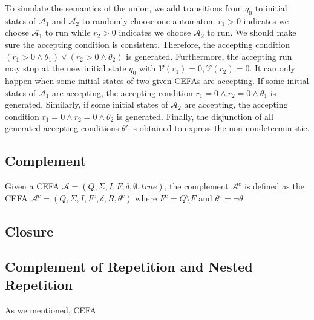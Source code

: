 \documentclass[runningheads]{llncs}
\newcommand*{\aut}{\mathcal{A}}
\begin{document}
To simulate the semantics of the union, we add transitions from $q_0$ to initial states of $\aut_1$ and $\aut_2$ to randomly choose one automaton. $r_1 > 0$ indicates we choose $\aut_1$ to run while $r_2 > 0$ indicates we choose $\aut_2$ to run. We should make sure the accepting condition is consistent. Therefore, the accepting condition $(r_1>0\wedge\theta_1)\vee(r_2>0\wedge\theta_2)$ is generated. Furthermore, the accepting run may stop at the new initial state $q_0$ with $\mathcal{V}(r_1) = 0, \mathcal{V}(r_2)=0$. It can only happen when some initial states of two given CEFAs are accepting. If some initial states of $\aut_1$ are accepting, the accepting condition $r_1=0\wedge r_2=0\wedge \theta_1$ is generated. Similarly, if some initial states of $\aut_2$ are accepting, the accepting condition $r_1=0\wedge r_2=0\wedge \theta_2$ is generated. Finally, the disjunction of all generated accepting conditions $\theta'$ is obtained to express the non-nondeterministic. 
\subsection{Complement}
Given a CEFA $\aut = (Q, \Sigma, I, F, \delta, \emptyset, true)$, the complement $\aut^c$ is defined as the CEFA $\aut^c = (Q, \Sigma, I, F^c, \delta, R, \theta^c)$ where $F^c = Q\setminus F$ and $\theta^c = \neg \theta$.
\subsection{Closure}
\subsection{Complement of Repetition and Nested Repetition}\label{subsec:comp}
As we mentioned,  CEFA 
\end{document}
